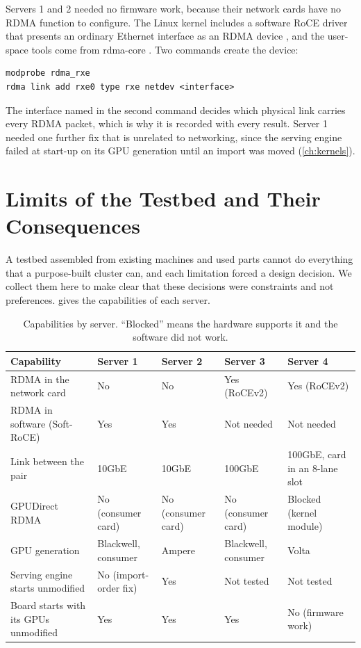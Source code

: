 Servers 1 and 2 needed no firmware work, because their network cards have no
RDMA function to configure. The Linux kernel includes a software RoCE driver
that presents an ordinary Ethernet interface as an RDMA device
\citep{ibta_softroce2015,kernel_ib}, and the user-space tools come from
rdma-core \citep{rdmacore}. Two commands create the device:\par
\begingroup{}
\begin{verbatim}
modprobe rdma_rxe
rdma link add rxe0 type rxe netdev <interface>
\end{verbatim}
\endgroup
The interface named in the second command decides which physical link carries
every RDMA packet, which is why it is recorded with every result. Server 1
needed one further fix that is unrelated to networking, since the serving
engine failed at start-up on its GPU generation until an import was moved
(\cref{ch:kernels}).

\section{Limits of the Testbed and Their Consequences}
\label{ch:compat}

A testbed assembled from existing machines and used parts cannot do
everything that a purpose-built cluster can, and each limitation forced a
design decision. We collect them here to make clear that these decisions were
constraints and not preferences.  gives the capabilities of
each server.

\begin{table}[htbp]
  \centering
  \caption[Capabilities by server]{Capabilities by server. ``Blocked'' means the hardware supports it and the software did not work.}
  \label{tab:compat}
  \small
  \begin{tabular}{L{4.4cm}L{2.3cm}L{2.3cm}L{2.3cm}L{2.6cm}}
    \toprule
    Capability & Server 1 & Server 2 & Server 3 & Server 4 \\
    \midrule
    RDMA in the network card & No & No & Yes (RoCEv2) & Yes (RoCEv2) \\
    RDMA in software (Soft-RoCE) & Yes & Yes & Not needed & Not needed \\
    Link between the pair & 10GbE & 10GbE & 100GbE & 100GbE, card in an 8-lane slot \\
    GPUDirect RDMA & No (consumer card) & No (consumer card) & No (consumer card) & Blocked (kernel module) \\
    GPU generation & Blackwell, consumer & Ampere & Blackwell, consumer & Volta \\
    Serving engine starts unmodified & No (import-order fix) & Yes & Not tested & Not tested \\
    Board starts with its GPUs unmodified & Yes & Yes & Yes & No (firmware work) \\
    \bottomrule
  \end{tabular}
\end{table}

